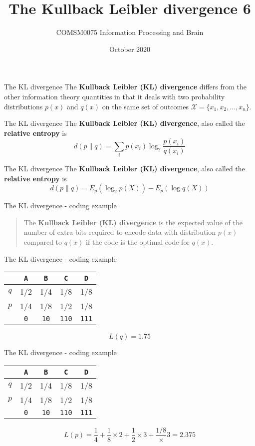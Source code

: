 \documentclass{beamer}
\title[Information Theory task 2]{The Kullback Leibler divergence 6}
\author{COMSM0075 Information Processing and Brain}
\institute{\texttt{comsm0075.github.io}}
\date{October 2020}
\newcommand{\crish}{\color{reddish}}
\newcommand{\cbla}{\color{black}}
\newcommand{\letter}[1]{\color{blue}\texttt{#1}\color{black}}
\newcommand{\binary}[1]{\color{red}\texttt{#1}\color{black}}
\begin{document}
\maketitle

\begin{frame}{The KL divergence}
  The \textbf{Kullback Leibler (KL) divergence} differs from the other
  information theory quantities in that it deals with two probability
  distributions $p(x)$ and $q(x)$ on the same set of outcomes
  \crish$\mathcal{X}=\{x_1,x_2,\ldots,x_n\}$\cbla.
\end{frame}

\begin{frame}{The KL divergence}
  The \textbf{Kullback Leibler (KL) divergence}, also called the \textbf{relative entropy} is
  \crish
  $$
  d(p\|q)=\sum_i p(x_i)\log_2{\frac{p(x_i)}{q(x_i)}}
    $$
    \cbla
\end{frame}

\begin{frame}{The KL divergence}
  The \textbf{Kullback Leibler (KL) divergence}, also called the \textbf{relative entropy} is
  \crish
  $$
  d(p\|q)=E_p(\log_2{p(X)})-E_p(\log{q(X)})
    $$
    \cbla
\end{frame}


\begin{frame}{The KL divergence - coding example}
\begin{quote}
  The \textbf{Kullback Leibler (KL) divergence} is the expected value
  of the number of extra bits required to encode data with
  distribution $p(x)$ compared to $q(x)$ if the code is the optimal code for
  $q(x)$.
  \end{quote}
\end{frame}

\begin{frame}{The KL divergence - coding example}

\begin{center}
\begin{tabular}{c|cccc}
&\letter{A}&\letter{B}&\letter{C}&\letter{D}\\
\hline
$q$&1/2&1/4&1/8&1/8\\
$p$&1/4&1/8&1/2&1/8\\
\hline
&\binary{0}&\binary{10}&\binary{110}&\binary{111}
\end{tabular}
\end{center}
\crish
$$
L(q)=1.75
$$
\cbla
\end{frame}


\begin{frame}{The KL divergence - coding example}
\begin{center}
\begin{tabular}{c|cccc}
&\letter{A}&\letter{B}&\letter{C}&\letter{D}\\
\hline
$q$&1/2&1/4&1/8&1/8\\
$p$&1/4&1/8&1/2&1/8\\
\hline
&\binary{0}&\binary{10}&\binary{110}&\binary{111}
\end{tabular}
\end{center}
\crish
$$
L(p)=\frac{1}{4}+\frac{1}{8}\times 2 +\frac{1}{2}\times 3+\frac{1/8}\times 3=2.375
$$
\cbla
\end{frame}
\end{document}
